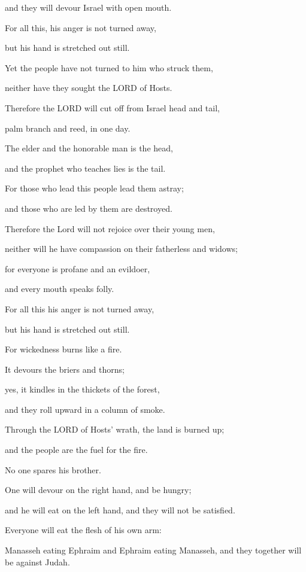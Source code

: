 and they will devour Israel with open mouth.

For all this, his anger is not turned away,

but his hand is stretched out still.


\vspace{\baselineskip} \myverse{}Yet the people have not turned to him who struck them,

neither have they sought the LORD of Hosts.

\myverse{}Therefore the LORD will cut off from Israel head and tail,

palm branch and reed, in one day.

\myverse{}The elder and the honorable man is the head,

and the prophet who teaches lies is the tail.

\myverse{}For those who lead this people lead them astray;

and those who are led by them are destroyed.

\myverse{}Therefore the Lord will not rejoice over their young men,

neither will he have compassion on their fatherless and widows;

for everyone is profane and an evildoer,

and every mouth speaks folly.

For all this his anger is not turned away,

but his hand is stretched out still.


\vspace{\baselineskip} \myverse{}For wickedness burns like a fire.

It devours the briers and thorns;

yes, it kindles in the thickets of the forest,

and they roll upward in a column of smoke.

\myverse{}Through the LORD of Hosts’ wrath, the land is burned up;

and the people are the fuel for the fire.

No one spares his brother.

\myverse{}One will devour on the right hand, and be hungry;

and he will eat on the left hand, and they will not be satisfied.

Everyone will eat the flesh of his own arm:

\myverse{}Manasseh eating Ephraim and Ephraim eating Manasseh,
and they together will be against Judah.

